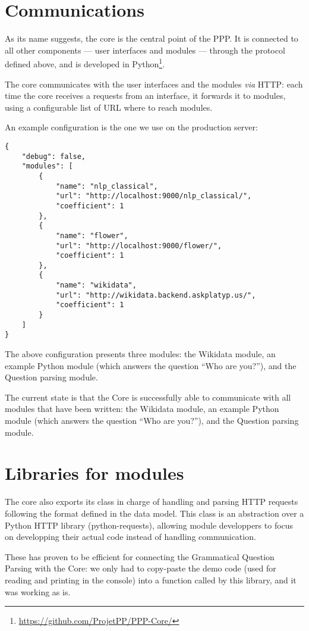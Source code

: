 \section{Communications}

As its name suggests, the core is the central point of the PPP. It is
connected to all other components — user interfaces and modules — through
the protocol defined above, and is developed in Python\footnote{\url{https://github.com/ProjetPP/PPP-Core/}}.

The core communicates with the user interfaces and the modules {\em via} HTTP:
each time the core receives a requests from an interface, it forwards it
to modules, using a configurable list of URL where to reach modules.

An example configuration is the one we use on the production server:

\begin{verbatim}
{
    "debug": false,
    "modules": [
        {
            "name": "nlp_classical",
            "url": "http://localhost:9000/nlp_classical/",
            "coefficient": 1
        },
        {
            "name": "flower",
            "url": "http://localhost:9000/flower/",
            "coefficient": 1
        },
        {
            "name": "wikidata",
            "url": "http://wikidata.backend.askplatyp.us/",
            "coefficient": 1
        }
    ]
}
\end{verbatim}

The above configuration presents three modules: the Wikidata module, an example 
Python module (which answers the question  “Who are you?”), and the Question parsing module.

The current state is that the Core is successfully able to
communicate with all modules
that have been written: the Wikidata module, an example Python module
(which answers the question  “Who are you?”), and the Question parsing module.

\section{Libraries for modules}

The core also exports its class in charge of handling and parsing HTTP
requests following the format defined in the data model.
This class is an abstraction over a Python HTTP library (python-requests),
allowing module developpers to focus on developping their actual code
instead of handling communication.

These has proven to be efficient for connecting the Grammatical Question Parsing
with the Core: we only had to copy-paste the demo code
(used for reading and printing in the console) into a function called
by this library, and it was working as is.


